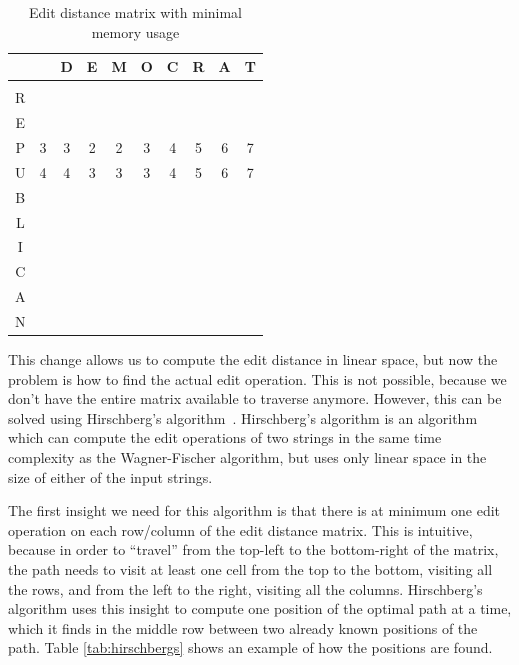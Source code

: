 \begin{table}
	\begin{center}
		\begin{tabular}[c]{c|c|c|c|c|c|c|c|c|c|}
			  &   & D & E & M & O & C & R & A & T \\\hline
			  &   &   &   &   &   &   &   &   &   \\\hline
			R &   &   &   &   &   &   &   &   &   \\\hline
			E &   &   &   &   &   &   &   &   &   \\\hline
			P & 3 & 3 & 2 & 2 & 3 & 4 & 5 & 6 & 7 \\\hline
			U & 4 & 4 & 3 & 3 & 3 & 4 & 5 & 6 & 7 \\\hline
			B &   &   &   &   &   &   &   &   &   \\\hline
			L &   &   &   &   &   &   &   &   &   \\\hline
			I &   &   &   &   &   &   &   &   &   \\\hline
			C &   &   &   &   &   &   &   &   &   \\\hline
			A &   &   &   &   &   &   &   &   &   \\\hline
			N &   &   &   &   &   &   &   &   &   \\\hline
		\end{tabular}
	\end{center}
	\caption{Edit distance matrix with minimal memory usage}
	\label{tab:minimalmemoryusageeditdistance}
\end{table}

This change allows us to compute the edit distance in linear space, but now the problem is
how to find the actual edit operation. This is not possible, because we don't have the
entire matrix available to traverse anymore. However, this can be solved using
Hirschberg's algorithm~\cite{HirschbergsAlgorithm}. Hirschberg's algorithm is an algorithm
which can compute the edit operations of two strings in the same time complexity as the
Wagner-Fischer algorithm, but uses only linear space in the size of either of the input
strings.

The first insight we need for this algorithm is that there is at minimum one edit
operation on each row/column of the edit distance matrix. This is intuitive, because in
order to ``travel'' from the top-left to the bottom-right of the matrix, the path needs to
visit at least one cell from the top to the bottom, visiting all the rows, and from the left
to the right, visiting all the columns. Hirschberg's algorithm uses this insight to
compute one position of the optimal path at a time, which it finds in the middle row
between two already known positions of the path. Table \ref{tab:hirschbergs} shows an
example of how the positions are found.

